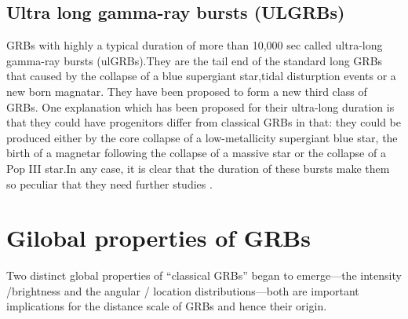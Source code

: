 \subsection{Ultra long gamma-ray bursts (ULGRBs)}
GRBs with highly a typical duration of more than 10,000 sec called ultra-long gamma-ray bursts (ulGRBs).They are the tail end of the standard long GRBs that caused by the collapse of a blue supergiant star,tidal disturption events or a new born magnatar. They have been proposed to form a new third class of GRBs. One explanation which has been proposed for their ultra-long duration is that they could have progenitors differ from classical GRBs in that: they could be produced either by the core collapse of a low-metallicity supergiant blue star, the birth of a magnetar following the collapse of a massive star or the collapse of a Pop III star.In any case, it is clear that the duration of these bursts make them so peculiar that they need further studies \citep{10} \citep{11}.
\section{Gilobal properties of GRBs}
Two distinct global properties of “classical GRBs” began to emerge—the intensity /brightness and the angular / location distributions—both are important implications for the distance scale of GRBs and hence their origin.
